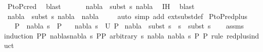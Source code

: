 \begin{isabellebody}
\ P{}{\isacharunderscore}{\kern0pt}to{\isacharunderscore}{\kern0pt}P{}{\isacharunderscore}{\kern0pt}cred\ \isamarkupfalse%
\ blast\ \isanewline
\ \ \isamarkupfalse%
\ \isamarkupfalse%
\ {\isachardoublequoteopen}nabla{}\ {\isasymTurnstile}\ {\isacharparenleft}{\kern0pt}subst\ s{}{\isacharparenright}{\kern0pt}\ nabla{}{\isachardoublequoteclose}\ \isamarkupfalse%
\ IH\ \isamarkupfalse%
\ blast\isanewline
\ \ \isamarkupfalse%
\ \isamarkupfalse%
\ {\isachardoublequoteopen}nabla{}\ {\isasymTurnstile}\ {\isacharparenleft}{\kern0pt}subst\ s{}{\isacharparenright}{\kern0pt}\ {\isacharparenleft}{\kern0pt}nabla{}\ {\isasymunion}\ nabla{}{\isacharparenright}{\kern0pt}{\isachardoublequoteclose}\isanewline
\ \ \ \ \isamarkupfalse%
{\isacharparenleft}{\kern0pt}auto\ simp\ add{\isacharcolon}{\kern0pt}\ ext{\isacharunderscore}{\kern0pt}subst{\isacharunderscore}{\kern0pt}def{\isacharparenright}{\kern0pt}\isanewline
{}\isamarkupfalse%
%
\endisatagproof
{\isafoldproof}%
%
\isadelimproof
\isanewline
%
\endisadelimproof
\isanewline
{}\isamarkupfalse%
\ P{}{\isacharunderscore}{\kern0pt}to{\isacharunderscore}{\kern0pt}P{}{\isacharunderscore}{\kern0pt}red{\isacharunderscore}{\kern0pt}plus{}{\isacharcolon}{\kern0pt}\isanewline
\ \ \ {\isachardoublequoteopen}P{}\ {\isasymTurnstile}\ {\isacharparenleft}{\kern0pt}nabla{\isacharcomma}{\kern0pt}\ s{\isacharparenright}{\kern0pt}\ {\isasymRightarrow}\ P{}{\isachardoublequoteclose}\isanewline
\ \ \ {\isachardoublequoteopen}{\isacharparenleft}{\kern0pt}nabla{}{\isacharcomma}{\kern0pt}\ s{}{\isacharparenright}{\kern0pt}\ {\isasymin}\ U\ P{}{\isachardoublequoteclose}\isanewline
{}\ {\isachardoublequoteopen}nabla{}\ {\isasymTurnstile}\ subst\ {\isacharparenleft}{\kern0pt}s{}\ {\isasymbullet}\ s{\isacharparenright}{\kern0pt}\ {\isasymapprox}\ subst\ s{}{\isachardoublequoteclose}\isanewline
%
\isadelimproof
\ \ %
\endisadelimproof
%
\isatagproof
{}\isamarkupfalse%
\ assms\isanewline
{}\isamarkupfalse%
{\isacharparenleft}{\kern0pt}induction\ P{}{\isasymequiv}{\isachardoublequoteopen}P{}{\isachardoublequoteclose}\ nablas{\isasymequiv}{\isachardoublequoteopen}{\isacharparenleft}{\kern0pt}nabla{\isacharcomma}{\kern0pt}\ s{\isacharparenright}{\kern0pt}{\isachardoublequoteclose}\ P{}{\isasymequiv}{\isachardoublequoteopen}P{}{\isachardoublequoteclose}\ arbitrary{\isacharcolon}{\kern0pt}\ s\ nabla{}\ nabla\ s{}\ P{}\ P{}\ rule{\isacharcolon}{\kern0pt}\ red{\isacharunderscore}{\kern0pt}plus{\isachardot}{\kern0pt}induct{\isacharparenright}{\kern0pt}\isanewline

\end{isabellebody}
